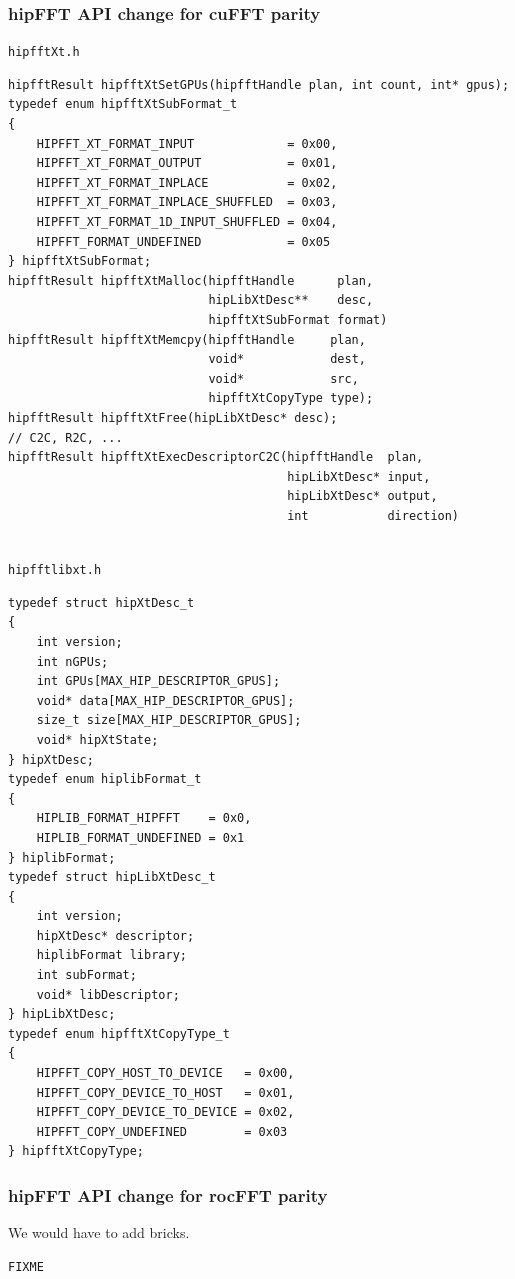 \documentclass[12pt]{article}
\renewcommand{\(}{\left(}
\renewcommand{\)}{\right)}
\begin{document}
\subsubsection{hipFFT API change for cuFFT parity}
\texttt{hipfftXt.h}
\begin{lstlisting}
hipfftResult hipfftXtSetGPUs(hipfftHandle plan, int count, int* gpus);
typedef enum hipfftXtSubFormat_t
{
    HIPFFT_XT_FORMAT_INPUT             = 0x00,
    HIPFFT_XT_FORMAT_OUTPUT            = 0x01,
    HIPFFT_XT_FORMAT_INPLACE           = 0x02,
    HIPFFT_XT_FORMAT_INPLACE_SHUFFLED  = 0x03,
    HIPFFT_XT_FORMAT_1D_INPUT_SHUFFLED = 0x04,
    HIPFFT_FORMAT_UNDEFINED            = 0x05
} hipfftXtSubFormat;
hipfftResult hipfftXtMalloc(hipfftHandle      plan,
                            hipLibXtDesc**    desc,
                            hipfftXtSubFormat format)
hipfftResult hipfftXtMemcpy(hipfftHandle     plan,
                            void*            dest,
                            void*            src,
                            hipfftXtCopyType type);
hipfftResult hipfftXtFree(hipLibXtDesc* desc);
// C2C, R2C, ...
hipfftResult hipfftXtExecDescriptorC2C(hipfftHandle  plan,
                                       hipLibXtDesc* input,
                                       hipLibXtDesc* output,
                                       int           direction)
                            
\end{lstlisting}

\texttt{hipfftlibxt.h}
\begin{lstlisting}
typedef struct hipXtDesc_t
{
    int version;
    int nGPUs;
    int GPUs[MAX_HIP_DESCRIPTOR_GPUS];
    void* data[MAX_HIP_DESCRIPTOR_GPUS];
    size_t size[MAX_HIP_DESCRIPTOR_GPUS];
    void* hipXtState;
} hipXtDesc;
typedef enum hiplibFormat_t
{
    HIPLIB_FORMAT_HIPFFT    = 0x0,
    HIPLIB_FORMAT_UNDEFINED = 0x1
} hiplibFormat;
typedef struct hipLibXtDesc_t
{
    int version;
    hipXtDesc* descriptor;
    hiplibFormat library;
    int subFormat;
    void* libDescriptor;
} hipLibXtDesc;
typedef enum hipfftXtCopyType_t
{
    HIPFFT_COPY_HOST_TO_DEVICE   = 0x00,
    HIPFFT_COPY_DEVICE_TO_HOST   = 0x01,
    HIPFFT_COPY_DEVICE_TO_DEVICE = 0x02,
    HIPFFT_COPY_UNDEFINED        = 0x03
} hipfftXtCopyType;
\end{lstlisting}


\subsubsection{hipFFT API change for rocFFT parity}
We would have to add bricks.
\begin{lstlisting}
FIXME
\end{lstlisting}
\end{document}
